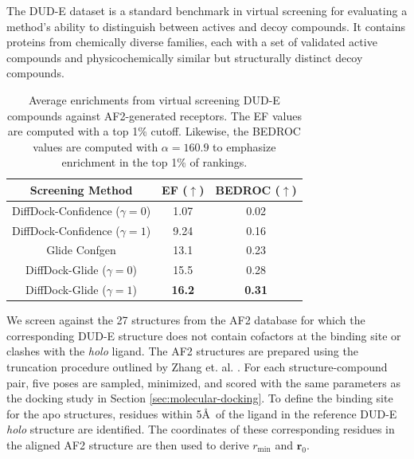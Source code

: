 \documentclass[letterpaper]{article}
\begin{document}
The DUD-E dataset is a standard benchmark in virtual screening for evaluating a method's ability to distinguish between actives and decoy compounds.\cite{mysinger2012dude} It contains proteins from chemically diverse families, each with a set of validated active compounds and physicochemically similar but structurally distinct decoy compounds.


\begin{table}[h]
    \centering
    \begin{tabular}{|c||c|c|}
        \hline
        Screening Method & EF ($\uparrow$) & BEDROC ($\uparrow$) \\
        \hline
        \hline
        DiffDock-Confidence ($\gamma=0$) & 1.07 & 0.02 \\
        \hline
        DiffDock-Confidence ($\gamma=1$) & 9.24 & 0.16 \\
        \hline
        Glide Confgen & 13.1 & 0.23 \\
        \hline
        DiffDock-Glide ($\gamma=0$) & 15.5 & 0.28 \\
        \hline
        DiffDock-Glide ($\gamma=1$) & \textbf{16.2} & \textbf{0.31} \\
        \hline
    \end{tabular}
    \caption{Average enrichments from virtual screening DUD-E compounds against AF2-generated receptors. The EF values are computed with a top 1\% cutoff. Likewise, the BEDROC values are computed with $\alpha=160.9$ to emphasize enrichment in the top 1\% of rankings.}
    \label{table:enrichment}
\end{table}

We screen against the 27 structures from the AF2 database for which the corresponding DUD-E structure does not contain cofactors at the binding site or clashes with the {\it holo} ligand. The AF2 structures are prepared using the truncation procedure outlined by Zhang et. al. \cite{zhang2023benchmarking}. For each structure-compound pair, five poses are sampled, minimized, and scored with the same parameters as the docking study in Section \ref{sec:molecular-docking}. To define the binding site for the apo structures, residues within 5\AA\ of the ligand in the reference DUD-E {\it holo} structure are identified. The coordinates of these corresponding residues in the aligned AF2 structure are then used to derive $r_\mathrm{min}$ and $\mathbf{r}_0$.

\end{document}

